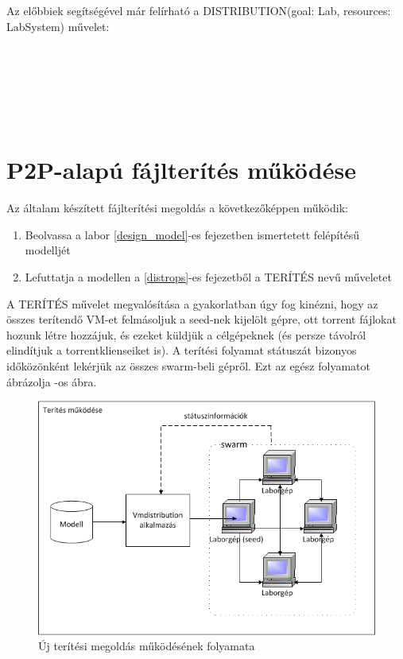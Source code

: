 Az előbbiek segítségével már felírható a DISTRIBUTION(goal: Lab, resources: LabSystem) művelet:

\\
\indent {}\\
\indent \indent {}\\
\indent \indent \indent	{}\\
\indent \indent \indent	{}\\
\indent \indent \indent \indent	{}


\section{P2P-alapú fájlterítés működése}
\label{design_apparchi}

Az általam készített fájlterítési megoldás a következőképpen működik:

\begin{enumerate}
  \item Beolvassa a labor \ref{design_model}-es fejezetben ismertetett felépítésű modelljét
  \item Lefuttatja a modellen a \ref{distrops}-es fejezetből a TERÍTÉS nevű műveletet
\end{enumerate}

A TERÍTÉS művelet megvalósítása a gyakorlatban úgy fog kinézni, hogy az összes terítendő VM-et felmásoljuk a seed-nek kijelölt gépre, ott torrent fájlokat hozunk létre hozzájuk, és ezeket küldjük a célgépeknek (és persze távolról elindítjuk a torrentklienseiket is). A terítési folyamat státuszát bizonyos időközönként lekérjük az összes swarm-beli gépről. Ezt az egész folyamatot ábrázolja -os ábra.

\begin{figure}[ht]
	\centering
	\includegraphics[width=115mm, keepaspectratio]{figures/design_overview.png}
	\caption{Új terítési megoldás működésének folyamata}
	\label{fig:designoverview}
\end{figure}


